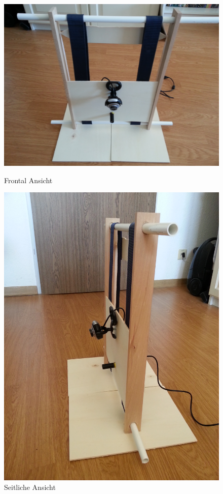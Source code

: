 \begin{figure}
\centering
\begin{minipage}{0.45\textwidth}
\centering \includegraphics[width=\textwidth]{images/Scanner1.jpg}
\caption{Frontal Ansicht}\label{fig:scanner1}
\end{minipage}
\begin{minipage}{0.45\textwidth}
\centering\includegraphics[width=\textwidth, angle = -90]{images/Scanner2.jpg}
\caption{Seitliche Ansicht}\label{fig:scanner2}
\end{minipage}
\end{figure}


